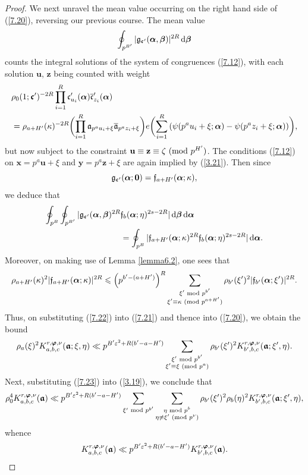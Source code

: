 \documentclass[12pt,reqno]{amsart}
\theoremstyle{definition}
\theoremstyle{remark}
\numberwithin{equation}{section}
\newcommand{\mmod}[1]{\,\,(\text{\rm mod}\,\,#1)}
\newcommand{\nmod}[1]{\,\,\text{\rm mod}\,\,#1}
\def\bfu{{\mathbf u}}
\def\bfx{{\mathbf x}}
\def\bfy{{\mathbf y}}
\def\bfz{{\mathbf z}}
\def\gra{{\mathfrak a}}\def\grA{{\mathfrak A}}\def\bfgra{{\boldsymbol \gra}}
\def\grc{{\mathfrak c}}\def\grC{{\mathfrak C}}\def\bfgrc{{\boldsymbol \grc}}
\def\grf{{\mathfrak f}}\def\grF{{\mathfrak F}}
\def\grg{{\mathfrak g}}\def\grG{{\mathfrak G}}
\def\zet{{\zeta}} \def\bfzet{{\boldsymbol \zeta}} \def\zetbar{{\overline \zet}}
\def\kap{{\kappa}}
\def\eps{\varepsilon}
\def\le{\leqslant} \def\ge{\geqslant} \def\pleq{\preccurlyeq} \def\ple{\prec}
\def\d{{\,{\rm d}}}
\begin{document}
\begin{proof}
\par We next unravel the mean value occurring on the right hand side of (\ref{7.20}), 
reversing our previous course. The mean value
$$\oint_{p^{B^\prime}}|\grg_{\bfgrc^\prime}(\bfalp,\bfbet)|^{2R}\d\bfbet $$
counts the integral solutions of the system of congruences (\ref{7.12}), with each solution 
$\bfu$, $\bfz$ being counted with weight
\begin{align*}
&\rho_0(1;\bfgrc^\prime)^{-2R}\prod_{i=1}^R\grc^\prime_{u_i}(\bfalp)
{\overline \grc^\prime_{z_i}(\bfalp)}\\
&=\rho_{a+H^\prime}(\kap)^{-2R}\biggl( \prod_{i=1}^R\gra_{p^au_i+\xi}
{\overline \gra_{p^az_i+\xi}}\biggr) 
e\biggl( \sum_{i=1}^R \left( \psi(p^au_i+\xi;\bfalp)-\psi(p^az_i+\xi;\bfalp )
\right)\biggr) ,
\end{align*}
but now subject to the constraint $\bfu\equiv \bfz\equiv \zet\mmod{p^{H^\prime}}$. The 
conditions (\ref{7.12}) on $\bfx=p^a\bfu+\xi$ and $\bfy=p^a\bfz+\xi$ are again implied by 
(\ref{3.21}). Then since
$$\grg_{\bfgrc^\prime}(\bfalp;{\mathbf 0})=\grf_{a+H^\prime}(\bfalp;\kap),$$
we deduce that
\begin{align}
\oint_{p^B}\oint_{p^{B^\prime}}|\grg_{\bfgrc^\prime}(\bfalp,\bfbet)^{2R}&
\grf_b(\bfalp;\eta)^{2s-2R}|\d\bfbet \d\bfalp \notag \\
&=\oint_{p^B}|\grf_{a+H^\prime}(\bfalp;\kap)^{2R}\grf_b(\bfalp;\eta)^{2s-2R}|
\d\bfalp .\label{7.21}
\end{align}
Moreover, on making use of Lemma \ref{lemma6.2}, one sees that
\begin{equation}\label{7.22}
\rho_{a+H^\prime}(\kap)^2|\grf_{a+H^\prime}(\bfalp;\kap)|^{2R}\le 
\left( p^{b^\prime -(a+H^\prime)}\right)^R 
\sum_{\substack{\xi^\prime \nmod{p^{b^\prime}}\\ \xi^\prime \equiv 
\kap\mmod{p^{a+H^\prime}}}}\rho_{b^\prime}(\xi^\prime)^2
|\grf_{b^\prime}(\bfalp;\xi^\prime)|^{2R}.
\end{equation}
Thus, on substituting (\ref{7.22}) into (\ref{7.21}) and thence into (\ref{7.20}), we obtain 
the bound
\begin{equation}\label{7.23}
\rho_a(\xi)^2K_{a,b,c}^{r,\bfvarphi,\nu}(\bfgra;\xi,\eta)\ll 
p^{B^\prime \eps^2+R(b^\prime -a-H^\prime)}
\sum_{\substack{\xi^\prime \nmod{p^{b^\prime}}\\ \xi^\prime \equiv \xi\mmod{p^a}}}
\rho_{b^\prime}(\xi^\prime)^2K_{b^\prime,b,c}^{r,\bfvarphi,\nu}(\bfgra;\xi^\prime,\eta).
\end{equation}
Next, substituting (\ref{7.23}) into (\ref{3.19}), we conclude that
$$\rho_0^4K_{a,b,c}^{r,\bfvarphi,\nu}(\bfgra)\ll 
p^{B^\prime \eps^2+R(b^\prime -a-H^\prime )}
\sum_{\xi^\prime \nmod{p^{b^\prime}}}\sum_{\substack{\eta\nmod{p^b}\\ 
\eta \not \equiv \xi^\prime \mmod{p^\nu}}}\rho_{b^\prime}(\xi^\prime)^2\rho_b(\eta)^2
K_{b^\prime,b,c}^{r,\bfvarphi,\nu}(\bfgra;\xi^\prime,\eta),$$
whence
\begin{equation}\label{7.24}
K_{a,b,c}^{r,\bfvarphi,\nu}(\bfgra)\ll 
p^{B^\prime \eps^2+R(b^\prime -a-H^\prime )}K_{b^\prime,b,c}^{r,\bfvarphi,\nu}
(\bfgra).
\end{equation}


\end{proof}
\end{document}
